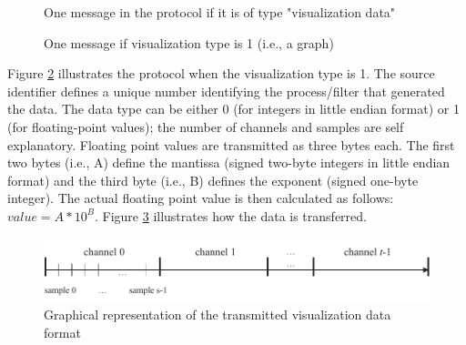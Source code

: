 \documentclass[letterpaper,oneside,12pt]{book}
\begin{document}
\begin{figure}[ht]
 \centerline{}
 \caption{One message in the protocol if it is of type "visualization data"}
 \label{visualizationprotocol}
\end{figure}

\begin{figure}[ht]
 \centerline{}
 \caption{One message if visualization type is 1 (i.e., a graph)}
 \label{visualizationprotocol_type1}
\end{figure}

Figure \ref{visualizationprotocol_type1} illustrates the protocol when the 
visualization type is 1. The source identifier defines a unique number 
identifying the process/filter that generated the data. The data type can be 
either 0 (for integers in little endian format) or 1 (for floating-point 
values); the number of channels and samples are self explanatory. Floating point 
values are transmitted as three bytes each. The first two bytes (i.e., A) define 
the mantissa (signed two-byte integers in little endian format) and the third 
byte (i.e., B) defines the exponent (signed one-byte integer). The actual floating 
point value is then calculated as follows: $value=A*10^{B}$. Figure 
\ref{visualization_type1} illustrates how the data is transferred.

\begin{figure}[ht]
 \centerline{\includegraphics{figures/visualization_type1}}
 \caption{Graphical representation of the transmitted visualization data format}
 \label{visualization_type1}
\end{figure}
\end{document}
